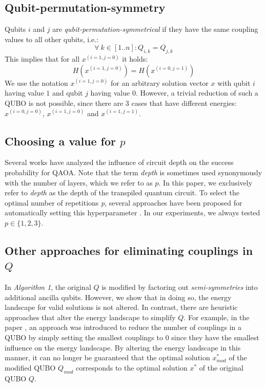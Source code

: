 \documentclass[conference]{IEEEtran}
\theoremstyle{plain}
\theoremstyle{definition}
\theoremstyle{remark}
\begin{document}
\subsection{Qubit-permutation-symmetry}
Qubits $i$ and $j$ are \textit{qubit-permutation-symmetrical} if they have the same coupling values to all other qubits, i.e.:
\[
\forall \: k \in [1..n] : Q_{i,k} = Q_{j,k}
\]
This implies that for all $x^{(i=1, j=0)}$ it holds:
\[ H(x^{(i=1, j=0)}) = H(x^{(i=0, j=1)}) \] We use the notation $x^{(i=1, j=0)}$ for an arbitrary solution vector $x$ with qubit $i$ having value $1$ and qubit $j$ having value $0$. However, a trivial reduction of such a QUBO is not possible, since there are $3$ cases that have different energies: $x^{(i=0, j=0)}$, $x^{(i=1, j=0)}$ and $x^{(i=1, j=1)}$.

\subsection{Choosing a value for $p$}
Several works \cite{niu2019optimizing, pan2022automatic, ni2023more} have analyzed the influence of circuit depth on the success probability for QAOA. Note that the term \textit{depth} is sometimes used synonymously with the number of layers, which we refer to as $p$. In this paper, we exclusively refer to \textit{depth} as the depth of the transpiled quantum circuit. To select the optimal number of repetitions \textit{p}, several approaches have been proposed for automatically setting this hyperparameter \cite{pan2022automatic, ni2023more, pan2022efficient, lee2021parameters}. In our experiments, we always tested $p \in \{1,2,3\}$.

\subsection{Other approaches for eliminating couplings in $Q$}

In \textit{Algorithm 1}, the original $Q$ is modified by factoring out \textit{semi-symmetries} into additional ancilla qubits. However, we show that in doing so, the energy landscape for valid solutions is not altered. In contrast, there are heuristic approaches that alter the energy landscape to simplify $Q$. For example, in the paper \cite{sax2020approximate}, an approach was introduced to reduce the number of couplings in a QUBO by simply setting the smallest couplings to $0$ since they have the smallest influence on the energy landscape. By altering the energy landscape in this manner, it can no longer be guaranteed that the optimal solution $x_{mod}^*$ of the modified QUBO $Q_{mod}$ corresponds to the optimal solution $x^*$ of the original QUBO $Q$. 
\end{document}
